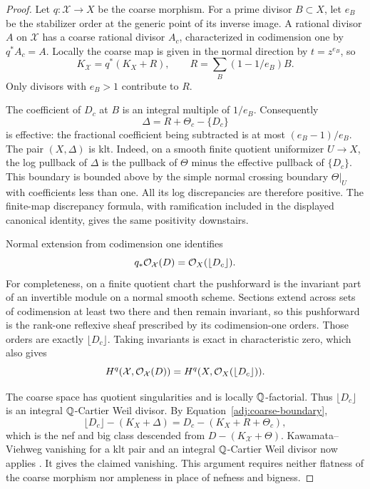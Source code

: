 \begin{proof}
Let $q:\mathcal X\to X$ be the coarse morphism.  For a prime divisor
$B\subset X$, let $e_B$ be the stabilizer order at the generic point
of its inverse image.  A rational divisor $A$ on $\mathcal X$ has a
coarse rational divisor $A_c$, characterized in codimension one by
$q^*A_c=A$.  Locally the coarse map is given in the normal direction
by $t=z^{e_B}$, so
\[
 K_{\mathcal X}=q^*(K_X+R),
 \qquad R=\sum_B(1-1/e_B)B.
\]
Only divisors with $e_B>1$ contribute to $R$.

The coefficient of $D_c$ at $B$ is an integral multiple of $1/e_B$.
Consequently
\begin{equation}\label{adj:coarse-boundary}
 \Delta=R+\Theta_c-\{D_c\}
\end{equation}
is effective: the fractional coefficient being subtracted is at most
$(e_B-1)/e_B$.  The pair $(X,\Delta)$ is klt.  Indeed, on a smooth
finite quotient uniformizer $U\to X$, the log pullback of $\Delta$
is the pullback of $\Theta$ minus the effective pullback of
$\{D_c\}$.  This boundary is bounded above by the simple normal
crossing boundary $\Theta|_U$ with coefficients less than one.
All its log discrepancies are therefore positive.  The finite-map
discrepancy formula, with ramification included in the displayed
canonical identity, gives the same positivity downstairs.

Normal extension from codimension one identifies
\[
 q_*\mathcal O_{\mathcal X}(D)=\mathcal O_X(\lfloor D_c\rfloor).
\]
For completeness, on a finite quotient chart the pushforward is the
invariant part of an invertible module on a normal smooth scheme.
Sections extend across sets of codimension at least two there and
then remain invariant, so this pushforward is the rank-one reflexive
sheaf prescribed by its codimension-one orders.  Those orders are
exactly $\lfloor D_c\rfloor$.  Taking invariants is exact in
characteristic zero, which also gives
\[
 H^q(\mathcal X,\mathcal O_{\mathcal X}(D))
   =H^q(X,\mathcal O_X(\lfloor D_c\rfloor)).
\]

The coarse space has quotient singularities and is locally
$\mathbb Q$-factorial.  Thus $\lfloor D_c\rfloor$ is an integral
$\mathbb Q$-Cartier Weil divisor.  By Equation~\eqref{adj:coarse-boundary},
\[
 \lfloor D_c\rfloor-(K_X+\Delta)
   =D_c-(K_X+R+\Theta_c),
\]
which is the nef and big class descended from
$D-(K_{\mathcal X}+\Theta)$.  Kawamata--Viehweg vanishing for a klt
pair and an integral $\mathbb Q$-Cartier Weil divisor now applies
\cite{FujinoKV}.  It gives the claimed vanishing.  This argument
requires neither flatness of the coarse morphism nor ampleness in
place of nefness and bigness.
\end{proof}

